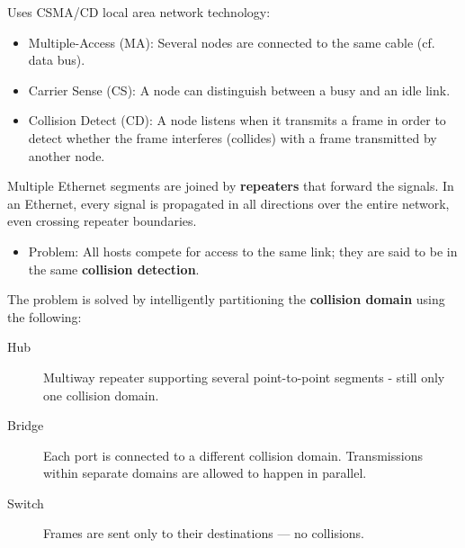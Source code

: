 \documentclass[11pt]{article}
\begin{document}
Uses CSMA/CD local area network technology:
\begin{itemize}
\item Multiple-Access (MA): Several nodes are connected to the same cable (cf. data bus).
\item Carrier Sense (CS): A node can distinguish between a busy and an idle link.
\item Collision Detect (CD): A node listens when it transmits a frame in order to detect whether the frame interferes (collides) with a frame transmitted by another node.
\end{itemize}
Multiple Ethernet segments are joined by \textbf{repeaters} that forward the signals.
In an Ethernet, every signal is propagated in all directions over the entire network, even crossing repeater boundaries.
\begin{itemize}
\item Problem: All hosts compete for access to the same link; they are said to be in the same \textbf{collision detection}.
\end{itemize}
The problem is solved by intelligently partitioning the \textbf{collision domain} using the following:
\begin{description}
\item[{Hub}] Multiway repeater supporting several point-to-point segments - still only one collision domain.
\item[{Bridge}] Each port is connected to a different collision domain. Transmissions within separate domains are allowed to happen in parallel.
\item[{Switch}] Frames are sent only to their destinations --- no collisions.
\end{description}
\end{document}
